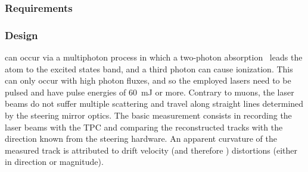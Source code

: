 



\subsubsection{Requirements}
\label{sec:sp-calib-laser-req}



\subsubsection{Design}
\label{sec:sp-calib-sys-las-ion-des}

\begin{comment} 
The design of the laser calibration system for \dword{dune} is largely based on the design of the system built for \dword{microboone}~\cite{microboone},that was based on several previous developments~\cite{Rossi:2009im,Zeller:2013sva,Ereditato:2014lra,Ereditato:82014tya}. A similar system was also built for CAPTAIN~\cite{Berns:2013usa} and in the near future, will be built for \dword{sbnd}~\cite{Antonello:2015lea}. Operation of the \dword{microboone} system has already taken place. A preliminary report was given in~\cite{bib:chen2018} and more details will be available in~\cite{bib:uBlaser2019}.

Ionization of \dword{lar} by laser \end{comment}can occur via a multiphoton process in which a two-photon  absorption~\cite{Badhrees:2010zz} leads the atom to the excited states band, and a third photon can cause ionization. This can only occur with high photon fluxes, and so the employed lasers need to be pulsed and have pulse energies of \SI{60}{\milli\joule} or more. Contrary to muons, the laser beams do not suffer multiple scattering and travel along straight lines determined by the steering mirror optics. The basic measurement consists in recording the laser beams with the TPC and comparing the reconstructed tracks with the direction known from the steering hardware. 
An apparent curvature of the measured track is attributed to drift velocity (and therefore \efield) distortions (either in direction or magnitude).



